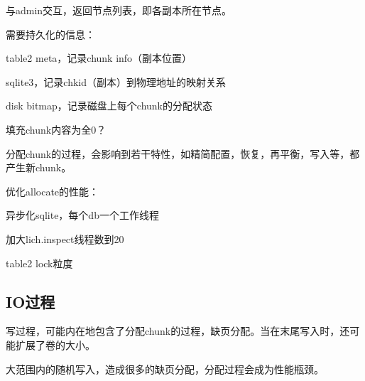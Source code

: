 与admin交互，返回节点列表，即各副本所在节点。

需要持久化的信息：
\begin{compactitem}
\item table2 meta，记录chunk info（副本位置）
\item sqlite3，记录chkid（副本）到物理地址的映射关系
\item disk bitmap，记录磁盘上每个chunk的分配状态
\item 填充chunk内容为全0？
\end{compactitem}

分配chunk的过程，会影响到若干特性，如精简配置，恢复，再平衡，写入等，都产生新chunk。

优化allocate的性能：
\begin{compactitem}
\item 异步化sqlite，每个db一个工作线程
\item 加大lich.inspect线程数到20
\item table2 lock粒度 
\end{compactitem}

\subsection{IO过程}

写过程，可能内在地包含了分配chunk的过程，缺页分配。当在末尾写入时，还可能扩展了卷的大小。

大范围内的随机写入，造成很多的缺页分配，分配过程会成为性能瓶颈。

